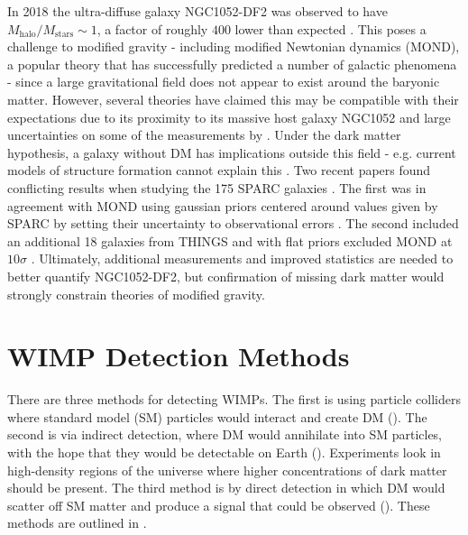 In 2018 the ultra-diffuse galaxy NGC1052-DF2 was observed to have $M_{\mathrm{halo}} / M_{\mathrm{stars}} \sim 1$, a factor of
roughly $400$
lower than expected .  This poses a challenge to modified gravity - including modified Newtonian
dynamics
(MOND), a popular theory that has successfully predicted a number of galactic phenomena  - since a large
gravitational
field does not appear to exist around the baryonic matter.  However, several theories have claimed this may be compatible with their
expectations due to its proximity to its massive host galaxy NGC1052 and large uncertainties on some of the measurements by
.  Under the dark matter hypothesis, a galaxy without DM has implications outside
this field - e.g. current models of structure formation cannot explain this .  Two recent
papers found conflicting results when studying the 175 SPARC
galaxies .  The first was in agreement with MOND using gaussian priors centered around values given by SPARC by
setting
their uncertainty to observational errors .  The second included an additional 18 galaxies from THINGS
 and with flat priors excluded MOND
at $10 \sigma$ .  Ultimately, additional measurements and improved statistics are needed to better
quantify NGC1052-DF2, but confirmation of missing dark matter would strongly constrain theories of modified gravity.


\section[WIMP Detection Methods][WIMP Detection Methods]{WIMP Detection Methods}
\label{sec:detection}

There are three methods for detecting WIMPs.  The first is using particle colliders where standard model (SM) particles would interact and
create DM ().  The second is via indirect detection, where DM would annihilate into SM particles, with the hope
that they would be detectable
on Earth ().  Experiments look in high-density regions of the universe where higher concentrations of dark matter
should be present.  The third method is by direct detection in which DM would scatter off SM matter and produce
a signal that could be observed ().  These methods are outlined in .


